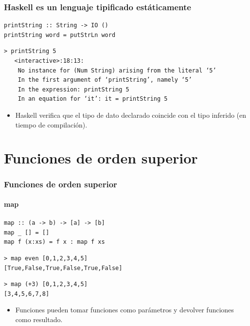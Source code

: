\documentclass{beamer}
\begin{document}
\begin{frame}[fragile]
  \frametitle{Haskell es un lenguaje tipificado estáticamente}

\begin{lstlisting}
printString :: String -> IO ()
printString word = putStrLn word
\end{lstlisting}

\vspace{0.3cm}

\begin{verbatim}
> printString 5
   <interactive>:18:13:
    No instance for (Num String) arising from the literal ‘5’
    In the first argument of ‘printString’, namely ‘5’
    In the expression: printString 5
    In an equation for ‘it’: it = printString 5
\end{verbatim}

\vspace{0.3cm}

\begin{itemize}
\item Haskell verifica que el tipo de dato declarado coincide con el tipo inferido (en tiempo de compilación). 
\end{itemize}

\end{frame}


\section{Funciones de orden superior}

\begin{frame}[fragile]
  \frametitle{Funciones de orden superior}
  \framesubtitle{map}

\begin{lstlisting}
map :: (a -> b) -> [a] -> [b]
map _ [] = []
map f (x:xs) = f x : map f xs
\end{lstlisting}

\vspace{0.3cm}

\begin{lstlisting}[numbers=none, backgroundcolor=\color{lightgray}, keywordstyle=\color{black}]
> map even [0,1,2,3,4,5]
[True,False,True,False,True,False]
\end{lstlisting}

\vspace{0.3cm}

\begin{lstlisting}[numbers=none, backgroundcolor=\color{lightgray}, keywordstyle=\color{black}]
> map (+3) [0,1,2,3,4,5]
[3,4,5,6,7,8]
\end{lstlisting}

\vspace{0.3cm}

\begin{itemize}
\item Funciones pueden tomar funciones como parámetros y devolver funciones como resultado.
\end{itemize}

\end{frame}
\end{document}
